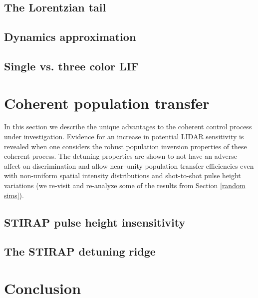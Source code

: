 \subsection{The Lorentzian tail}

\subsection{Dynamics approximation}

\subsection{Single vs. three color LIF}

\section{Coherent population transfer}
In this section we describe the unique advantages to the coherent control process under investigation. Evidence for an increase in potential LIDAR sensitivity is revealed when one considers the robust population inversion properties of these coherent process. The detuning properties are shown to not have an adverse affect on discrimination and allow near--unity population transfer efficiencies even with non-uniform spatial intensity distributions and shot-to-shot pulse height variations (we re-visit and re-analyze some of the results from Section \ref{random sims}).
\subsection{STIRAP pulse height insensitivity}



\subsection{The STIRAP detuning ridge}

\section{Conclusion}

